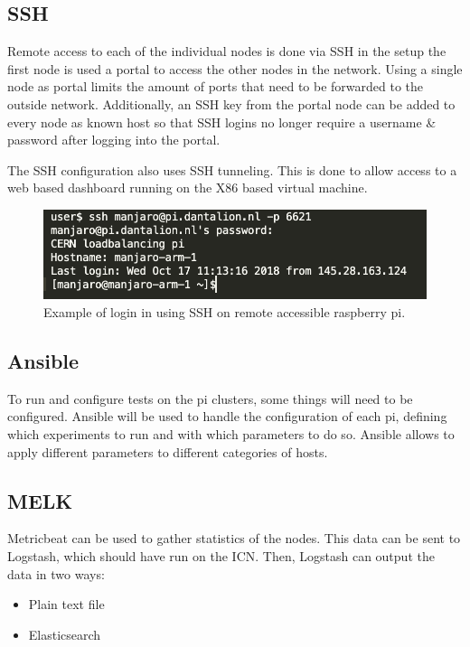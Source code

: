 \documentclass[]{article}
\begin{document}
\subsection{SSH}
Remote access to each of the individual nodes is done via SSH in the setup the first node is used a portal to access the other nodes in the network. Using a single node as portal limits the amount of ports that need to be forwarded to the outside network. Additionally, an SSH key from the portal node can be added to every node as known host so that SSH logins no longer require a username \& password after logging into the portal.

The SSH configuration also uses SSH tunneling. This is done to allow access to a web based dashboard running on the X86 based virtual machine.

\begin{center}
	\begin{figure}[H]
		\includegraphics[width=\textwidth]{images/ssh}
		\caption{Example of login in using SSH on remote accessible raspberry pi.}
		\label{fig:ssh}
	\end{figure}
\end{center}

\subsection{Ansible}
To run and configure tests on the pi clusters, some things will need to be configured. Ansible will be used to handle the configuration of each pi, defining which experiments to run and with which parameters to do so. Ansible allows to apply different parameters to different categories of hosts.

\subsection{MELK}
Metricbeat can be used to gather statistics of the nodes. This data can be sent to Logstash, which should have run on the ICN. Then, Logstash can output the data in two ways:
\begin{itemize}
	\itemsep 0em
	\item Plain text file
	\item Elasticsearch
\end{itemize}
\end{document}
